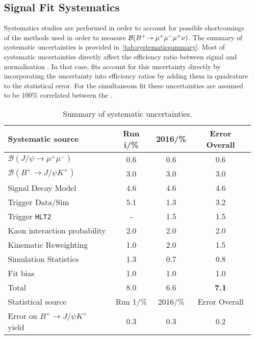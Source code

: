 \subsection{Signal Fit Systematics}
\label{systematics}
Systematics studies are performed in order to account for possible shortcomings of the methods used in order to measure $\mathcal{B}({{{B}^+}}\!\rightarrow {\ensuremath{\mu^+\mu^-\mu^+}}\nu)$. The summary of systematic uncertainties is provided in~\autoref{tab:systematicsummary}. Most of \DIFdelbegin {}\DIFdelend \DIFaddbegin {}\DIFaddend systematic uncertainties directly affect the efficiency ratio between \DIFaddbegin {}\DIFaddend signal and normalisation \DIFdelbegin {}\DIFdelend \DIFaddbegin {}\DIFaddend . In that case, fits account for this uncertainty directly by incorporating the uncertainty into \DIFaddbegin {}\DIFaddend efficiency ratios by adding them in quadrature to the statistical error. For the simultaneous fit these uncertainties are assumed to be $100\%$ correlated between the \DIFdelbegin {}\DIFdelend \DIFaddbegin {}\DIFaddend .


\begin{table}[H]
\centering
\begin{tabular}{ l  c  c  c  }
\toprule
Systematic source & Run \Rn{1}/\% &  2016/\% & Error Overall \\ \hline

$\mathcal{B}(J/\psi \rightarrow \mu^{+} \mu^{-})$ & 0.6 & 0.6 & 0.6\\
$\mathcal{B}(B^{+} \rightarrow  J/\psi K^{+})$ & 3.0 & 3.0 & 3.0\\
\hline
Signal Decay Model & 4.6 & 4.6 & 4.6\\
Trigger Data/Sim & 5.1 & 1.3& 3.2\\
Trigger \texttt{HLT2} &  -  &  1.5& 1.5\\
Kaon interaction probability &  2.0  &  2.0& 2.0\\
Kinematic Reweighting & 1.0 & 2.0 &1.5\\
Simulation Statistics & 1.3 & 0.7 & 0.8 \\
Fit bias & 1.0 & 1.0 & 1.0  \\
 \hline
 Total & 8.0 & 6.6 & \textbf{7.1} \\
 \hline
Statistical source & Run 1/\% & 2016/\% & Error Overall \\ \hline
Error on $B^{+} \rightarrow J/\psi K^{+}$ yield & 0.3 & 0.3 & 0.2\\
 \bottomrule
\end{tabular}
\caption{Summary of systematic uncertainties.}
\label{tab:systematicsummary}
\end{table}




